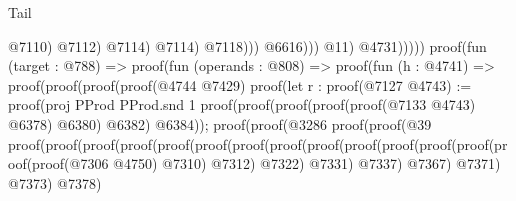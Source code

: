 \begin{lexlean}{Tail}
\begin{coremodule}
                                                                            @7110)
                                                                          @7112)
                                                                        @7114)
                                                                      @7114)
                                                                    @7118)))
                                                          @6616)))
                                                  @11)
                                                @4731)))))
                                    proof(fun (target : @788) =>
                                      proof(fun (operands : @808) =>
                                        proof(fun (h : @4741) =>
                                          proof(proof(proof(proof(@4744 @7429)
                                                  proof(let r : proof(@7127
                                                        @4743) := proof(proj PProd PProd.snd 1
                                                      proof(proof(proof(proof(proof(@7133 @4743)
                                                                @6378)
                                                              @6380)
                                                            @6382)
                                                          @6384));
                                                    proof(proof(@3286
                                                          proof(proof(@39
                                                                proof(proof(proof(proof(proof(proof(proof(proof(proof(proof(proof(proof(proof(proof(proof(@7306
                                                                                                @4750)
                                                                                              @7310)
                                                                                            @7312)
                                                                                          @7322)
                                                                                        @7331)
                                                                                      @7337)
                                                                                    @7367)
                                                                                  @7371)
                                                                                @7373)
                                                                              @7378)

\end{coremodule}
\end{lexlean}
